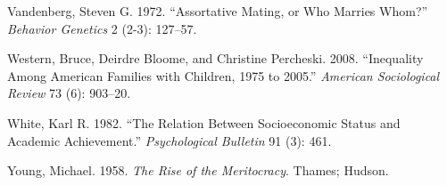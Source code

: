 \documentclass[
]{article}
\newlength{\cslhangindent}
\newlength{\cslentryspacingunit} %
\newenvironment{CSLReferences}[2] %
 {%
  \setlength{\parindent}{0pt}
  \ifodd #1
  \let\oldpar\par
  \def\par{\hangindent=\cslhangindent\oldpar}
  \fi
  \setlength{\parskip}{#2\cslentryspacingunit}
 }%
 {}
\theoremstyle{definition}
\theoremstyle{definition}
\theoremstyle{definition}
\theoremstyle{definition}
\theoremstyle{remark}
\begin{document}
\begin{CSLReferences}{1}{0}
\leavevmode{}%
Vandenberg, Steven G. 1972. {``Assortative Mating, or Who Marries Whom?''} \emph{Behavior Genetics} 2 (2-3): 127--57.

\leavevmode{}%
Western, Bruce, Deirdre Bloome, and Christine Percheski. 2008. {``Inequality Among American Families with Children, 1975 to 2005.''} \emph{American Sociological Review} 73 (6): 903--20.

\leavevmode{}%
White, Karl R. 1982. {``The Relation Between Socioeconomic Status and Academic Achievement.''} \emph{Psychological Bulletin} 91 (3): 461.

\leavevmode{}%
Young, Michael. 1958. \emph{The Rise of the Meritocracy}. Thames; Hudson.

\end{CSLReferences}
\end{document}
